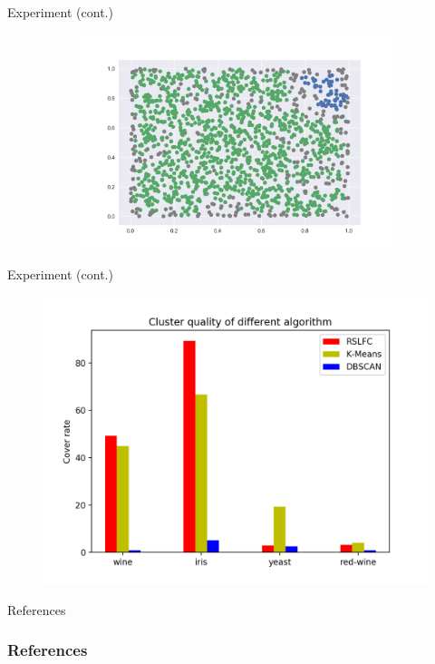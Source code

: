 \documentclass{beamer}
\begin{document}
\begin{frame}{Experiment (cont.)}
\begin{figure}[h!]
\begin{subfigure}{.5\textwidth}
	\end{subfigure}%
	\begin{subfigure}{.5\textwidth}
		\centering
		\includegraphics[width=.8\linewidth]{r_figure_2.png}
	\end{subfigure}
\end{figure}
\end{frame}

\begin{frame}{Experiment (cont.)}

\begin{figure}[h!]
	\centering
	\includegraphics[scale=0.6]{hist1.png}
\end{figure}

\end{frame}

\begin{frame}{References}


\frametitle{References}
\nocite{chaudhuri2010rates, campello2013density, McInnes2017}


\end{frame}
\end{document}
